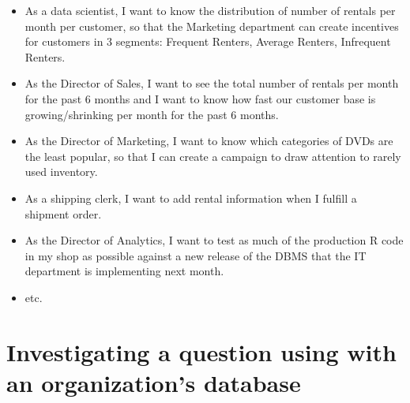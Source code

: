 \documentclass[]{book}
\providecommand{\tightlist}{%
  \setlength{\itemsep}{0pt}\setlength{\parskip}{0pt}}
\theoremstyle{definition}
\theoremstyle{definition}
\theoremstyle{definition}
\theoremstyle{remark}
\begin{document}
\begin{itemize}
\tightlist
\item
  As a data scientist, I want to know the distribution of number of
  rentals per month per customer, so that the Marketing department can
  create incentives for customers in 3 segments: Frequent Renters,
  Average Renters, Infrequent Renters.
\item
  As the Director of Sales, I want to see the total number of rentals
  per month for the past 6 months and I want to know how fast our
  customer base is growing/shrinking per month for the past 6 months.
\item
  As the Director of Marketing, I want to know which categories of DVDs
  are the least popular, so that I can create a campaign to draw
  attention to rarely used inventory.
\item
  As a shipping clerk, I want to add rental information when I fulfill a
  shipment order.
\item
  As the Director of Analytics, I want to test as much of the production
  R code in my shop as possible against a new release of the DBMS that
  the IT department is implementing next month.
\item
  etc.
\end{itemize}

\hypertarget{investigating-a-question-using-with-an-organizations-database}{%
\section{Investigating a question using with an organization's
database}\label{investigating-a-question-using-with-an-organizations-database}}
\end{document}
